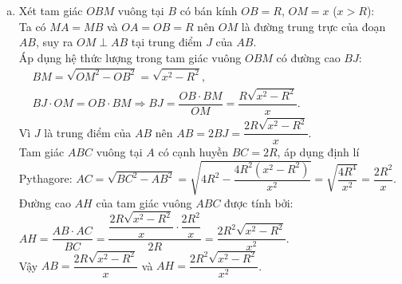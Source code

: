 \begin{bt}
{\begin{enumerate}[a)]
    Lại có $\widehat{MAB} + \widehat{MAK} = \widehat{CAB} = 90^\circ$ và $\widehat{MBA} + \widehat{MKA} = 90^\circ$ (trong tam giác vuông $KAB$).\\
    Suy ra $\widehat{MAK} = \widehat{MKA}$, do đó tam giác $MAK$ cân tại $M \Rightarrow MA = MK$.\\
    Từ đó suy ra $MB = MK$, tức là $M$ là trung điểm của đoạn thẳng $BK$.\\
    Trong tam giác $CKB$, do $AH \parallel BK$, áp dụng hệ quả định lí Thales ta có:
    $\dfrac{IH}{MB} = \dfrac{CI}{CM} = \dfrac{IA}{MK}$.\\
    Vì $MB = MK$ nên $IH = IA$, suy ra $I$ là trung điểm của $AH$.
    \item Xét tam giác $OBM$ vuông tại $B$ có bán kính $OB = R$, $OM = x$ ($x > R$):\\
    Ta có $MA = MB$ và $OA = OB = R$ nên $OM$ là đường trung trực của đoạn $AB$, suy ra $OM \perp AB$ tại trung điểm $J$ của $AB$.\\
    Áp dụng hệ thức lượng trong tam giác vuông $OBM$ có đường cao $BJ$:
    $\begin{aligned}
    &BM = \sqrt{OM^2 - OB^2} = \sqrt{x^2 - R^2}, \\
    &BJ \cdot OM = OB \cdot BM \Rightarrow BJ = \dfrac{OB \cdot BM}{OM} = \dfrac{R\sqrt{x^2 - R^2}}{x}.
    \end{aligned}$\\
    Vì $J$ là trung điểm của $AB$ nên $AB = 2BJ = \dfrac{2R\sqrt{x^2 - R^2}}{x}$.\\
    Tam giác $ABC$ vuông tại $A$ có cạnh huyền $BC = 2R$, áp dụng định lí Pythagore:
    $AC = \sqrt{BC^2 - AB^2} = \sqrt{4R^2 - \dfrac{4R^2(x^2 - R^2)}{x^2}} = \sqrt{\dfrac{4R^4}{x^2}} = \dfrac{2R^2}{x}$.\\
    Đường cao $AH$ của tam giác vuông $ABC$ được tính bởi:
    $AH = \dfrac{AB \cdot AC}{BC} = \dfrac{\dfrac{2R\sqrt{x^2 - R^2}}{x} \cdot \dfrac{2R^2}{x}}{2R} = \dfrac{2R^2\sqrt{x^2 - R^2}}{x^2}$.\\
    Vậy $AB = \dfrac{2R\sqrt{x^2 - R^2}}{x}$ và $AH = \dfrac{2R^2\sqrt{x^2 - R^2}}{x^2}$.
\end{enumerate}
}
\end{bt}

